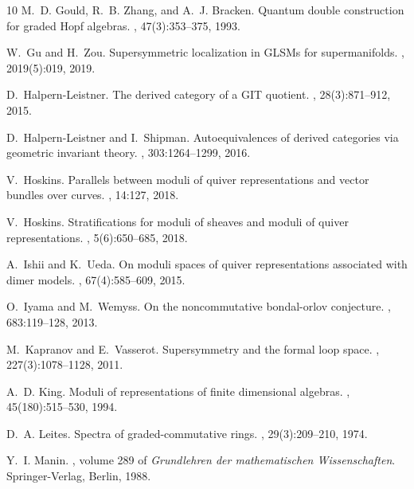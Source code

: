 \documentclass[11pt,a4paper,reqno,noamsfonts]{amsart}
\numberwithin{equation}{section}
\theoremstyle{definition}
\theoremstyle{remark}
\begin{document}
\begin{thebibliography}{10}
M.~D. Gould, R.~B. Zhang, and A.~J. Bracken.
\newblock Quantum double construction for graded {H}opf algebras.
, 47(3):353--375, 1993.

W.~Gu and H.~Zou.
\newblock Supersymmetric localization in {GLSM}s for supermanifolds.
, 2019(5):019, 2019.

D.~Halpern-Leistner.
\newblock The derived category of a {GIT} quotient.
, 28(3):871--912, 2015.

D.~Halpern-Leistner and I.~Shipman.
\newblock Autoequivalences of derived categories via geometric invariant
  theory.
, 303:1264--1299, 2016.

V.~Hoskins.
\newblock Parallels between moduli of quiver representations and vector bundles
  over curves.
, 14:127, 2018.

V.~Hoskins.
\newblock Stratifications for moduli of sheaves and moduli of quiver
  representations.
, 5(6):650--685, 2018.

A.~Ishii and K.~Ueda.
\newblock On moduli spaces of quiver representations associated with dimer
  models.
, 67(4):585--609, 2015.

O.~Iyama and M.~Wemyss.
\newblock On the noncommutative bondal-orlov conjecture.
, 683:119--128, 2013.

M.~Kapranov and E.~Vasserot.
\newblock Supersymmetry and the formal loop space.
, 227(3):1078--1128, 2011.

A.~D. King.
\newblock Moduli of representations of finite dimensional algebras.
, 45(180):515--530, 1994.

D.~A. Leites.
\newblock Spectra of graded-commutative rings.
, 29(3):209--210, 1974.

Y.~I. Manin.
, volume 289 of {\em
  Grundlehren der mathematischen Wissenschaften}.
\newblock Springer-Verlag, Berlin, 1988.


\end{thebibliography}
\end{document}
